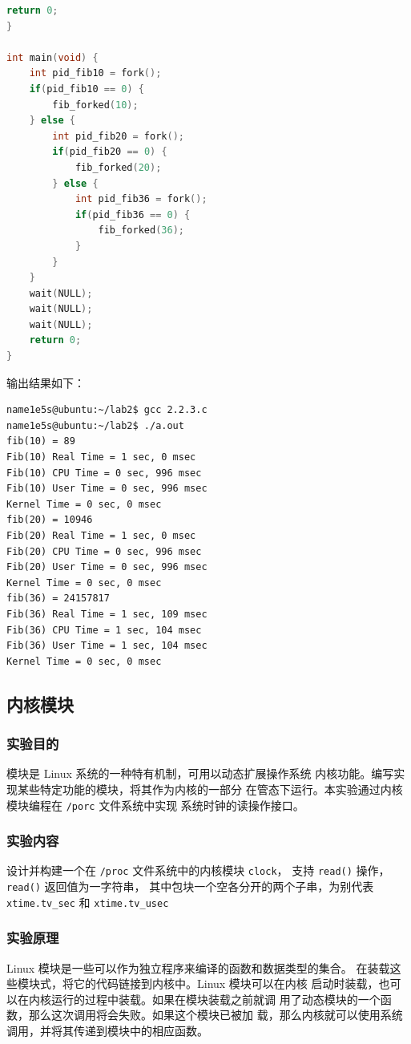 \documentclass[blue,normal,cn]{elegantnote}
\newcommand{\code}[1]{\colorbox{light-gray}{\texttt{#1}}}
\begin{document}
\begin{lstlisting}[language=C]
    return 0;
}

int main(void) {
    int pid_fib10 = fork();
    if(pid_fib10 == 0) {
        fib_forked(10);
    } else {
        int pid_fib20 = fork();
        if(pid_fib20 == 0) {
            fib_forked(20);
        } else {
            int pid_fib36 = fork();
            if(pid_fib36 == 0) {
                fib_forked(36);
            }
        }
    }
    wait(NULL);
    wait(NULL);
    wait(NULL);
    return 0;
}
\end{lstlisting}

输出结果如下：

\begin{lstlisting}
name1e5s@ubuntu:~/lab2$ gcc 2.2.3.c
name1e5s@ubuntu:~/lab2$ ./a.out
fib(10) = 89
Fib(10) Real Time = 1 sec, 0 msec
Fib(10) CPU Time = 0 sec, 996 msec
Fib(10) User Time = 0 sec, 996 msec
Kernel Time = 0 sec, 0 msec
fib(20) = 10946
Fib(20) Real Time = 1 sec, 0 msec
Fib(20) CPU Time = 0 sec, 996 msec
Fib(20) User Time = 0 sec, 996 msec
Kernel Time = 0 sec, 0 msec
fib(36) = 24157817
Fib(36) Real Time = 1 sec, 109 msec
Fib(36) CPU Time = 1 sec, 104 msec
Fib(36) User Time = 1 sec, 104 msec
Kernel Time = 0 sec, 0 msec
\end{lstlisting}

\subsection{内核模块}
\subsubsection{实验目的}
模块是 Linux 系统的一种特有机制，可用以动态扩展操作系统
内核功能。编写实现某些特定功能的模块，将其作为内核的一部分
在管态下运行。本实验通过内核模块编程在 \code{/porc} 文件系统中实现
系统时钟的读操作接口。
\subsubsection{实验内容}
设计并构建一个在 \code{/proc} 文件系统中的内核模块 \code{clock}，
支持 \code{read()} 操作，\code{read()} 返回值为一字符串，
其中包块一个空各分开的两个子串，为别代表 \code{xtime.tv\_sec} 
和 \code{xtime.tv\_usec}
\subsubsection{实验原理}
Linux 模块是一些可以作为独立程序来编译的函数和数据类型的集合。
在装载这些模块式，将它的代码链接到内核中。Linux 模块可以在内核
启动时装载，也可以在内核运行的过程中装载。如果在模块装载之前就调
用了动态模块的一个函数，那么这次调用将会失败。如果这个模块已被加
载，那么内核就可以使用系统调用，并将其传递到模块中的相应函数。
\end{document}

